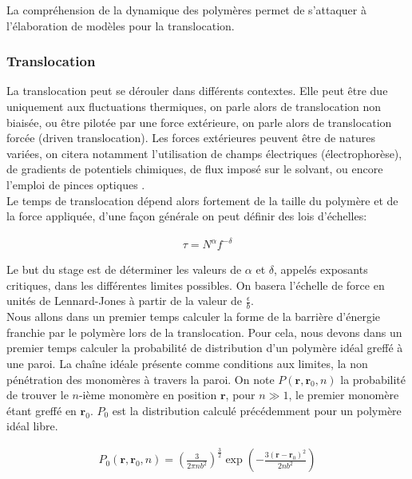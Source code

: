 \documentclass[a4paper,11pt]{article}
\begin{document}
La compréhension de la dynamique des polymères permet de s'attaquer à l'élaboration de modèles pour la translocation.










\subsubsection{Translocation}



La translocation peut se dérouler dans différents contextes. Elle peut être due uniquement aux fluctuations thermiques, on parle alors de translocation non biaisée, ou être pilotée par une force extérieure, on parle alors de translocation forcée (driven translocation). Les forces extérieures peuvent être de natures variées, on citera notamment l'utilisation de champs électriques (électrophorèse), de gradients de potentiels chimiques, de flux imposé sur le solvant, ou encore l'emploi de pinces optiques \cite{keyser}.\\

Le temps de translocation dépend alors fortement de la taille du polymère et de la force appliquée, d'une façon générale on peut définir des lois d'échelles:

\begin{eqnarray}
\tau = N^\alpha f^{-\delta}
\label{tau}
\end{eqnarray}

 Le but du stage est de déterminer les valeurs de $\alpha$ et $\delta$, appelés exposants critiques, dans les différentes limites possibles. On basera l'échelle de force en unités de Lennard-Jones à partir de la valeur de $\frac{\epsilon}{b}$.\\

Nous allons dans un premier temps calculer la forme de la barrière d'énergie franchie par le polymère lors de la translocation. Pour cela, nous devons dans un premier temps calculer la probabilité de distribution d'un polymère idéal greffé à une paroi. La chaîne idéale présente comme conditions aux limites, la non pénétration des monomères à travers la paroi. On note $P(\textbf{r},\textbf{r}_0,n)$ la probabilité de trouver le $n$-ième monomère en position $\textbf{r}$, pour $n \gg 1$, le premier monomère étant greffé en $\textbf{r}_0$. $P_0$ est la distribution calculé précédemment pour un polymère idéal libre.

\begin{eqnarray}
P_0(\textbf{r},\textbf{r}_0,n)=\left(\frac{3}{2\pi n b^2}\right)^\frac{3}{2}\exp\left(-\frac{3(\textbf{r}-\textbf{r}_0)^2}{2 n b^2}\right)
\end{eqnarray}
\end{document}
